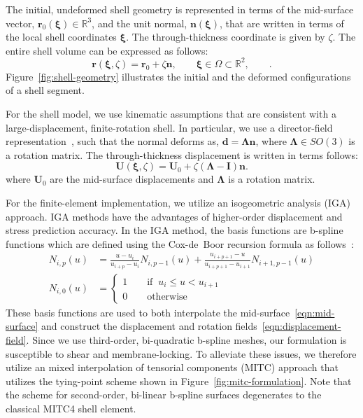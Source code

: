 \documentclass[12pt,headinclude,headsepline]{article}
\newcommand{\f}{\frac}
\newcommand{\mb}{\mathbf}
\newcommand{\mbs}{\boldsymbol}
\begin{document}
The initial,
undeformed shell geometry is represented in terms of the mid-surface
vector, $\mb{r}_{0}(\mbs{\xi}) \in \mathbb{R}^{3}$, and the unit
normal, $\mb{n}(\mbs{\xi})$, that are written in terms of the local
shell coordinates $\mbs{\xi}$. The through-thickness coordinate is
given by $\zeta$. The entire shell volume can be expressed as follows:
%
\begin{equation} 
  \mb{r}(\mbs{\xi}, \zeta) = 
  \mb{r}_{0} + \zeta \mb{n}, 
  \qquad \mbs{\xi} \in \Omega \subset \mathbb{R}^{2}, \qquad.
  \label{eqn:mid-surface}
\end{equation}
Figure~\ref{fig:shell-geometry} illustrates the initial and the deformed
configurations of a shell segment. 

For the shell model, we use kinematic assumptions that are consistent
with a large-displacement, finite-rotation shell. In particular, we
use a director-field representation~\citep{Simo:1989:SRG1}, such that
the normal deforms as, $\mb{d} = \mbs{\Lambda} \mb{n}$, where
$\mbs{\Lambda} \in SO(3)$ is a rotation matrix. The through-thickness
displacement is written in terms follows:
%
\begin{equation*}
  \label{eqn:displacement-field}
  \mb{U}(\mbs{\xi}, \zeta) = \mb{U}_{0} + \zeta (\mbs{\Lambda} - \mb{I}) \mb{n}.
\end{equation*}
where $\mb{U}_{0}$ are the mid-surface displacements and $\mbs{\Lambda}$ is
a rotation matrix.

For the finite-element implementation, we utilize an isogeometric
analysis (IGA) approach. IGA methods have the advantages of
higher-order displacement and stress prediction accuracy. In the IGA
method, the basis functions are b-spline functions which are defined
using the Cox-de~Boor recursion formula as follows~\citep{NURBSbook}:
%
\begin{equation}
  \label{eqn:b-spline-basis}
  \begin{aligned}
    N_{i,p}(u) & = \f{u - u_{i}}{u_{i+p} - u_{i}} N_{i,p-1}(u) + \f{u_{i+p+1} - u}{u_{i+p+1} - u_{i+1}}N_{i+1,p-1}(u) \\
    N_{i,0}(u) & = \left\{ 
      \begin{array}{l} 
        1 \qquad \text{if}\;\; u_{i} \le u < u_{i+1} \\
        0 \qquad \text{otherwise}
      \end{array} \right.
  \end{aligned}
\end{equation}
%
These basis functions are used to both interpolate the
mid-surface~\eqref{eqn:mid-surface} and construct the displacement and
rotation fields~\eqref{eqn:displacement-field}. Since we use
third-order, bi-quadratic b-spline meshes, our formulation is
susceptible to shear and membrane-locking. To alleviate these issues,
we therefore utilize an mixed interpolation of tensorial components
(MITC) approach that utilizes the tying-point scheme shown in
Figure~\ref{fig:mitc-formulation}.  Note that the scheme for
second-order, bi-linear b-spline surfaces degenerates to the classical
MITC4 shell element.
\end{document}
